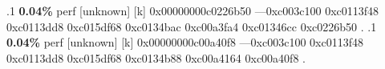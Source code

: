 \begin{profile}
{.1 \textbf{ 0.04\%} perf             [unknown]              [k] 0x00000000c0226b50\newline {} ---0xc003c100\newline {} 0xc0113f48\newline {} 0xc0113dd8\newline {} 0xc015df68\newline {} 0xc0134bac\newline {} 0xc00a3fa4\newline {} 0xc01346cc\newline {} 0xc0226b50\newline {} . 
.1 \textbf{ 0.04\%} perf             [unknown]              [k] 0x00000000c00a40f8\newline {} ---0xc003c100\newline {} 0xc0113f48\newline {} 0xc0113dd8\newline {} 0xc015df68\newline {} 0xc0134b88\newline {} 0xc00a4164\newline {} 0xc00a40f8\newline {} \newline {} \newline {} \newline {} . 
}
\end{profile}

